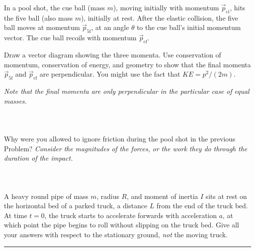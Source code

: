 \documentclass[12pt]{article}
\newcounter{problem}
\begin{document}
In a pool shot, the cue ball (mass $m$), moving initially with
momentum $\vec{p}_\mathrm{ci}$, hits the five ball (also mass $m$),
initially at rest.  After the elastic collision, the five ball moves
at momentum $\vec{p}_\mathrm{5f}$, at an angle $\theta$ to the cue
ball's initial momentum vector.  The cue ball recoils with momentum
$\vec{p}_\mathrm{cf}$.

Draw a vector diagram showing the three momenta.  Use conservation of
momentum, conservation of energy, and geometry to show that the final
momenta $\vec{p}_\mathrm{5f}$ and $\vec{p}_\mathrm{cf}$ are
perpendicular.  You might use the fact that $KE= p^2/(2m)$.

\emph{Note that the final momenta are only perpendicular in the
particular case of equal masses.}

\paragraph{\problemname~\theproblem}

Why were you allowed to ignore friction during the pool shot in the
previous Problem?  \emph{Consider the magnitudes of the forces, or the
work they do through the duration of the impact.}

\paragraph{\problemname~\theproblem}

A heavy round pipe of mass $m$, radius $R$, and moment of inertia $I$
sits at rest on the horizontal bed of a parked truck, a distance $L$
from the end of the truck bed.  At time $t=0$, the truck starts to
accelerate forwards with acceleration $a$, at which point the pipe
begins to roll without slipping on the truck bed.  Give all your
answers with respect to the stationary ground, {\em not} the moving
truck.
\\ \rule{0.3\textwidth}{0pt}
\end{document}
